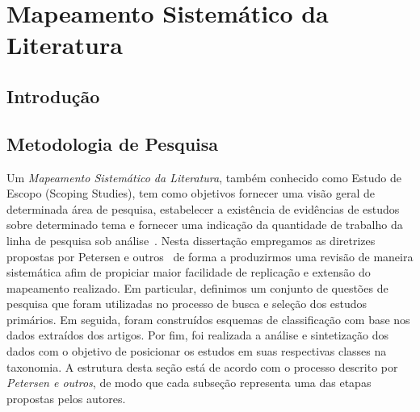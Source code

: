 
\chapter{Mapeamento Sistemático da Literatura}
\label{ch:mapeamento-sistematico}

\section{Introdução}
\label{sec:map-intro}

\section{Metodologia de Pesquisa}
\label{sec:map-metodologia}

Um \textit{Mapeamento Sistemático da Literatura}, também conhecido como Estudo de Escopo (Scoping
Studies), tem como objetivos fornecer uma visão geral de determinada área de pesquisa, estabelecer a
existência de evidências de estudos sobre determinado tema e fornecer uma indicação da quantidade de
trabalho da linha de pesquisa sob análise~\cite{keele2007guidelines,wohlin2012experimentation}.
Nesta dissertação empregamos as diretrizes propostas por Petersen e outros~\cite{Petersen2008} de
forma a produzirmos uma revisão de maneira sistemática afim de propiciar maior facilidade de
replicação e extensão do mapeamento realizado. Em particular, definimos um conjunto de questões de
pesquisa que foram utilizadas no processo de busca e seleção dos estudos primários. Em seguida,
foram construídos esquemas de classificação com base nos dados extraídos  dos artigos. Por fim, foi
realizada a análise e sintetização dos dados com o objetivo de posicionar os estudos em suas
respectivas classes na taxonomia. A estrutura desta seção está de acordo com o processo descrito 
por \textit{Petersen e outros}, de modo que cada subseção representa uma das etapas propostas pelos autores.

